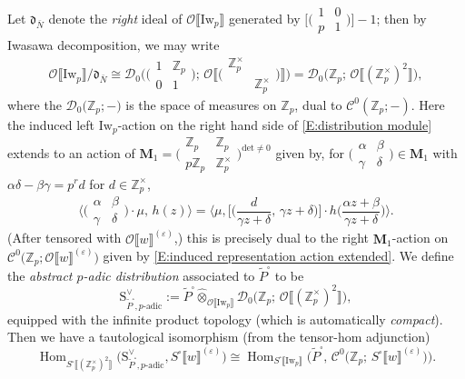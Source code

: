 \documentclass[12pt]{amsart}
\theoremstyle{definition}
\numberwithin{equation}{subsection}
\def\calC{\mathcal{C}}
\def\calD{\mathcal{D}}
\def\calO{\mathcal{O}}
\def\ZZ{\mathbb{Z}}
\def\bfM{\mathbf{M}}
\def\rmS{\mathrm{S}}
\DeclareMathOperator{\Hom}{Hom}
\newcommand{\Iw}{\mathrm{Iw}}
\renewcommand{\det}{\mathrm{det}}
\newcommand{\Matrix}[4]{{\big(\begin{smallmatrix}#1&#2\\#3& #4\end{smallmatrix} \big)}}
\begin{document}
Let $\mathfrak{d}_{\bar N}$ denote the \emph{right} ideal of $\calO\llbracket\Iw_p\rrbracket$ generated by $\big[\Matrix 10p1\big]-1$; then by Iwasawa decomposition, we may write
\begin{equation}
\label{E:distribution module}
\calO\llbracket\Iw_p\rrbracket / \mathfrak{d}_{\bar N} \cong \calD_0\Big(\Matrix 1{\ZZ_p}01;\, \calO\Big\llbracket\Big( \begin{smallmatrix}
\ZZ_p^\times \\ & \ZZ_p^\times
\end{smallmatrix}\Big)\Big\rrbracket\Big) =  \calD_0\big(\ZZ_p;\, \calO\llbracket (\ZZ_p^\times)^2\rrbracket\big),
\end{equation}
where the $\calD_0\big(\ZZ_p; -)$ is the space of measures on $\ZZ_p$, dual to $\calC^0(\ZZ_p;-)$. Here the induced left $\Iw_p$-action on the right hand side of \eqref{E:distribution module} extends to an action of $\bfM_1 = \Big( \begin{smallmatrix}
\ZZ_p & \ZZ_p \\ p\ZZ_p& \ZZ_p^\times
\end{smallmatrix}\Big)^{\det \neq 0}$ given by, for $\Matrix \alpha \beta \gamma \delta \in \bfM_1$ with $\alpha \delta - \beta\gamma = p^rd$ for $d \in \ZZ_p^\times$,
$$\big \langle
\Matrix \alpha \beta \gamma \delta \cdot \mu,\, h(z)\big\rangle = \Big\langle \mu,  \Big[\Big(\frac{d}{\gamma z+\delta},\, \gamma z+\delta\Big)\Big] \cdot h\Big(\frac{\alpha z+\beta}{\gamma z+\delta}\Big) \Big\rangle. 
$$
(After tensored with $\calO\llbracket w\rrbracket^{(\varepsilon)}$,) this is precisely dual to the right $\bfM_1$-action on $\calC^0\big(\ZZ_p; \calO\llbracket w\rrbracket^{(\varepsilon)}\big)$ given by \eqref{E:induced representation action extended}. We define the \emph{abstract $p$-adic distribution} associated to $\widetilde P^\square$ to be
 $$\rmS^\vee_{\widetilde P^\square, p\textrm{-adic}}:= \widetilde P^\square \widehat \otimes_{\calO\llbracket\Iw_p\rrbracket}\calD_0\big(\ZZ_p; \, \calO\llbracket (\ZZ_p^\times)^2\rrbracket\big),$$
equipped with the infinite product topology (which is automatically \emph{compact}). Then we have a tautological isomorphism (from the  tensor-hom adjunction)
\begin{equation}
\label{E:distribution and form duality}
\Hom_{S^\square\llbracket (\ZZ_p^\times)^2\rrbracket}\big( \rmS^\vee_{\widetilde P^\square, p\textrm{-adic}}, S^\square\llbracket w\rrbracket^{(\varepsilon)}\big) \cong \Hom_{S^\square\llbracket \Iw_p\rrbracket}\big(\widetilde P^\square, \, \calC^0\big(\ZZ_p; \, S^\square\llbracket w\rrbracket^{(\varepsilon)}\big)\big).
\end{equation}
\end{document}
